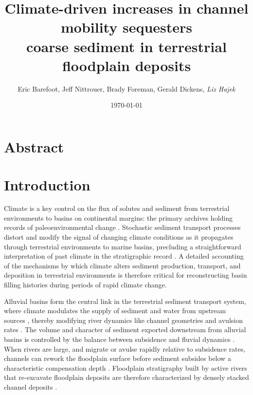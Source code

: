 \documentclass[draft]{compact_proposal}\usepackage[]{graphicx}\usepackage[]{color}
\title{Climate-driven increases in channel mobility sequesters \\ coarse sediment in terrestrial floodplain deposits}
\author{Eric Barefoot, Jeff Nittrouer, Brady Foreman, Gerald Dickens, \textit{Liz Hajek}}
\date{\today}
\begin{document}
\maketitle





\section{Abstract}

\section{Introduction}

Climate is a key control on the flux of solutes and sediment from terrestrial environments to basins on continental margins: the primary archives holding records of paleoenvironmental change \parencite[e.g.][]{zachos_early_2008, emiliani_pleistocene_1955}.
Stochastic sediment transport processes distort and modify the signal of changing climate conditions as it propagates through terrestrial environments to marine basins, precluding a straightforward interpretation of past climate in the stratigraphic record \parencite{foreman_autogenic_2017, romans_environmental_2016, armitage_transformation_2011}.
A detailed accounting of the mechanisms by which climate alters sediment production, transport, and deposition in terrestrial environments is therefore critical for reconstructing basin filling histories during periods of rapid climate change.

Alluvial basins form the central link in the terrestrial sediment transport system, where climate modulates the supply of sediment and water from upstream sources \parencite{romans_environmental_2016}, thereby modifying river dynamics like channel geometries and avulsion rates \parencite{bryant_experimental_1995, heller_downstream_1996}. 
The volume and character of sediment exported downstream from alluvial basins is controlled by the balance between subsidence and fluvial dynamics \parencite{allen_studies_1978, leeder_quantitative_1977, bridge_simulation_1979}.
When rivers are large, and migrate or avulse rapidly relative to subsidence rates, channels can rework the floodplain surface before sediment subsides below a characteristic compensation depth \parencite{hajek_flow-depth_2012, wickert_river_2013}.
Floodplain stratigraphy built by active rivers that re-excavate floodplain deposits are therefore characterized by densely stacked channel deposits \parencite{heller_downstream_1996}.
\end{document}
